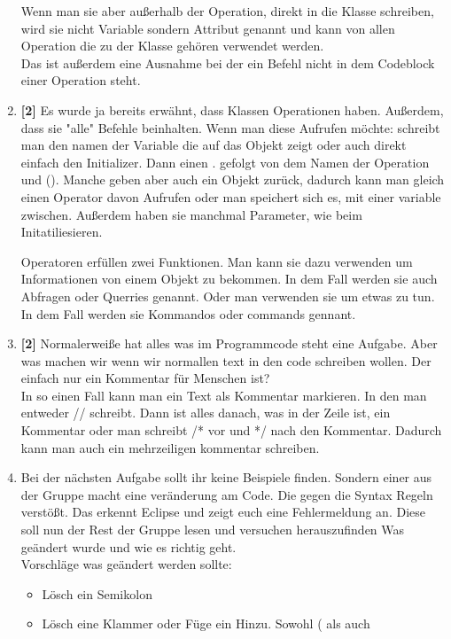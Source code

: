 \begin{enumerate}
\begin{Infobox}[Attribute]
        Wenn man sie aber außerhalb der Operation, direkt in die Klasse schreiben, wird sie nicht Variable sondern Attribut genannt und kann von allen Operation die zu der Klasse gehören verwendet werden.\\
        Das ist außerdem eine Ausnahme bei der ein Befehl nicht in dem Codeblock einer Operation steht.
    \end{Infobox}
    \item \textbf{[2]} Es wurde ja bereits erwähnt, dass Klassen Operationen haben. Außerdem, dass sie "alle" Befehle beinhalten. Wenn man diese Aufrufen möchte: schreibt man den namen der Variable die auf das Objekt zeigt oder auch direkt einfach den Initializer. Dann einen . gefolgt von dem Namen der Operation und (). Manche geben aber auch ein Objekt zurück, dadurch kann man gleich einen Operator davon Aufrufen oder man speichert sich es, mit einer variable zwischen. Außerdem haben sie manchmal Parameter, wie beim Initatiliesieren.
    \begin{Infobox}[Operatoren]
        Operatoren erfüllen zwei Funktionen. Man kann sie dazu verwenden um Informationen von einem Objekt zu bekommen. In dem Fall werden sie auch Abfragen oder Querries genannt.
        Oder man verwenden sie um etwas zu tun. In dem Fall werden sie Kommandos oder commands gennant.
    \end{Infobox}
    \item \textbf{[2]} Normalerweiße hat alles was im Programmcode steht eine Aufgabe. Aber was machen wir wenn wir normallen text in den code schreiben wollen. Der einfach nur ein Kommentar für Menschen ist?\\
    In so einen Fall kann man ein Text als Kommentar markieren. In den man entweder // schreibt. Dann ist alles danach, was in der Zeile ist, ein Kommentar oder man schreibt /* vor und */ nach den Kommentar. Dadurch kann man auch ein mehrzeiligen kommentar schreiben.
    \item Bei der nächsten Aufgabe sollt ihr keine Beispiele finden. Sondern einer aus der Gruppe macht eine veränderung am Code. Die gegen die Syntax Regeln verstößt. Das erkennt Eclipse und zeigt euch eine Fehlermeldung an. Diese soll nun der Rest der Gruppe lesen und versuchen herauszufinden Was geändert wurde und wie es richtig geht.\\
    Vorschläge was geändert werden sollte:
    \begin{itemize}
        \item Lösch ein Semikolon
        \item Lösch eine Klammer oder Füge ein Hinzu. Sowohl ( als auch {
}
\end{itemize}
\end{enumerate}
